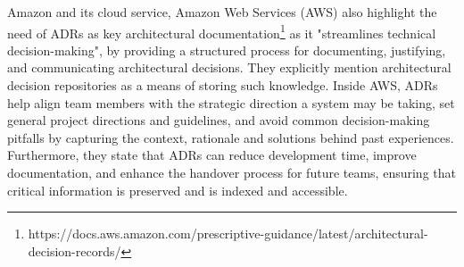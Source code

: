         Amazon and its cloud service, Amazon Web Services (AWS) also highlight the need of ADRs as key architectural documentation\footnote{https://docs.aws.amazon.com/prescriptive-guidance/latest/architectural-decision-records/} as it "streamlines technical decision-making", by providing a structured process for documenting, justifying, and communicating architectural decisions. They explicitly mention architectural decision repositories as a means of storing such knowledge. Inside AWS, ADRs help align team members with the strategic direction a system may be taking, set general project directions and guidelines, and avoid common decision-making pitfalls by capturing the context, rationale and solutions behind past experiences. Furthermore, they state that ADRs can reduce development time, improve documentation, and enhance the handover process for future teams, ensuring that critical information is preserved and is indexed and accessible. 

